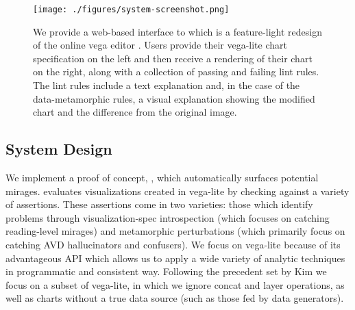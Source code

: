 \begin{figure}[bth]
   \centering
   \texttt{[image: ./figures/system-screenshot.png]}
   \caption{
   We provide a web-based interface to \SYSTEMNAME{ } which is a feature-light redesign of the online vega editor \protect\cite{vegaonline}.
   Users provide their vega-lite chart specification on the left and then receive a rendering of their chart on the right, along with a collection of passing and failing lint rules.
   The lint rules include a text explanation and, in the case of the data-metamorphic rules, a visual explanation showing the modified chart and the difference from the original image.
   }
   \label{fig:system-diagram}
\end{figure}




\subsection{System Design}
We implement a proof of concept, \SYSTEMNAME, which automatically surfaces potential mirages. \SYSTEMNAME{ } evaluates visualizations created in vega-lite \cite{satyanarayan2016vega} by checking against a variety of assertions. These assertions come in two varieties: those which identify problems through visualization-spec introspection (which focuses on catching reading-level mirages) and metamorphic perturbations (which primarily focus on catching AVD hallucinators and confusers). We focus on vega-lite because of its advantageous API which allows us to apply a wide variety of analytic techniques in programmatic and consistent way. Following the precedent set by Kim \etal we focus on a subset of vega-lite\cite{kim2017graphscape}, in which we ignore concat and layer operations, as well as charts without a true data source (such as those fed by data generators).



